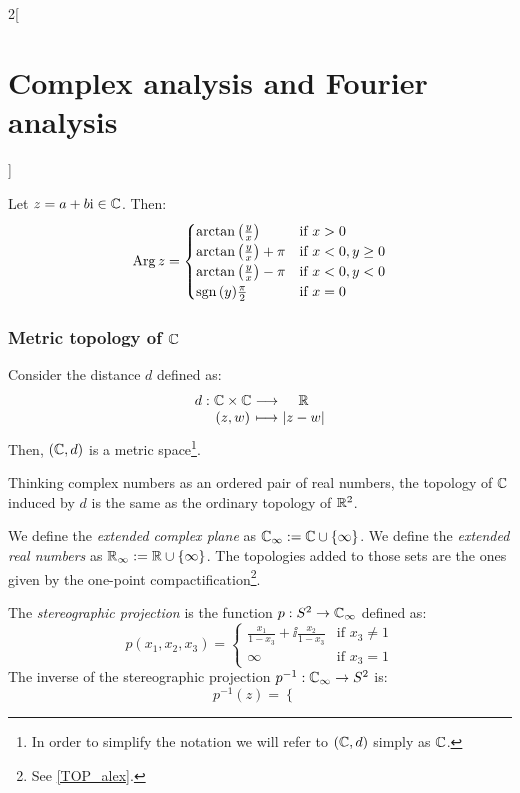 \documentclass[../../../main.tex]{subfiles}
\begin{document}
\begin{multicols}{2}[\section{Complex analysis and Fourier analysis}]
\begin{definition}
  \end{definition}
  \begin{proposition}
    Let $z=a+b\ii\in\CC$. Then:
    $$\Arg z=
      \begin{cases}
        \arctan\left(\frac{y}{x}\right)     & \text{if }x>0         \\
        \arctan\left(\frac{y}{x}\right)+\pi & \text{if }x<0,y\geq 0 \\
        \arctan\left(\frac{y}{x}\right)-\pi & \text{if }x<0,y<0     \\
        \sign{(y)}\frac{\pi}{2}             & \text{if }x=0
      \end{cases}
    $$
  \end{proposition}
  \subsubsection{Metric topology of \texorpdfstring{$\CC$}{C}}
  \begin{proposition}
    Consider the distance $d$ defined as: $$\function{d}{\CC\times\CC}{\RR}{(z,w)}{\abs{z-w}}$$ Then, $(\CC,d)$ is a metric space\footnote{In order to simplify the notation we will refer to $(\CC,d)$ simply as $\CC$.}.
  \end{proposition}
  \begin{proposition}
    Thinking complex numbers as an ordered pair of real numbers, the topology of $\CC$ induced by $d$ is the same as the ordinary topology of $\RR^2$.
  \end{proposition}
  \begin{definition}
    We define the \emph{extended complex plane} as $\CC_\infty:=\CC\cup\{\infty\}$. We define the \emph{extended real numbers} as $\RR_\infty:=\RR\cup\{\infty\}$. The topologies added to those sets are the ones given by the one-point compactification\footnote{See \cref{TOP_alex}.}.
  \end{definition}
  \begin{definition}
    The \emph{stereographic projection} is the function $p:S^2\rightarrow\CC_\infty$ defined as:
    $$p(x_1,x_2,x_3)=
      \begin{cases}
        \frac{x_1}{1-x_3}+\ii\frac{x_2}{1-x_3} & \text{if }x_3\ne 1 \\
        \infty                                 & \text{if }x_3= 1
      \end{cases}$$
    The inverse of the stereographic projection $p^{-1}:\CC_\infty\rightarrow S^2$ is:
    $$p^{-1}(z)=
      \begin{cases}

\end{cases}$$
\end{definition}
\end{multicols}
\end{document}
